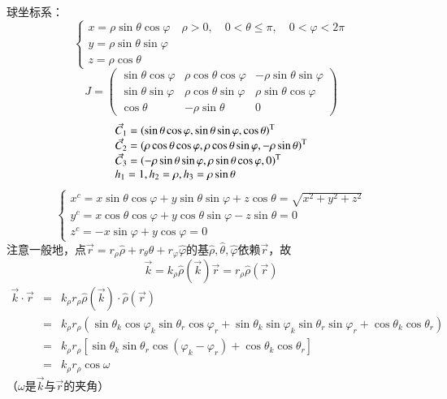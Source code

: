 \documentclass{article} %
\begin{document}
\noindent 球坐标系：
\[\left\{\begin{array}{l} {x=\rho \sin \theta \cos \varphi \quad \rho >0,\quad 0<\theta \le \pi ,\quad 0<\varphi <2\pi } \\ {y=\rho \sin \theta \sin \varphi } \\ {z=\rho \cos \theta } \end{array}\right. \] 
\[J=\left(\begin{array}{ccc} {\sin \theta \cos \varphi } & {\rho \cos \theta \cos \varphi } & {-\rho \sin \theta \sin \varphi } \\ {\sin \theta \sin \varphi } & {\rho \cos \theta \sin \varphi } & {\rho \sin \theta \cos \varphi } \\ {\cos \theta } & {-\rho \sin \theta } & {0} \end{array}\right)\] 
\[\begin{array}{l} {\vec{C}_{1} =\left(\sin \theta \cos \varphi ,\sin \theta \sin \varphi ,\cos \theta \right)^{{\rm T}} } \\ {\vec{C}_{2} =\left(\rho \cos \theta \cos \varphi ,\rho \cos \theta \sin \varphi ,-\rho \sin \theta \right)^{{\rm T}} } \\ {\vec{C}_{3} =\left(-\rho \sin \theta \sin \varphi ,\rho \sin \theta \cos \varphi ,0\right)^{{\rm T}} } \\ {h_{1} =1,h_{2} =\rho ,h_{3} =\rho \sin \theta } \end{array}\] 
\[\left\{\begin{array}{l} {x^{c} =x\sin \theta \cos \varphi +y\sin \theta \sin \varphi +z\cos \theta =\sqrt{x^{2} +y^{2} +z^{2} } } \\ {y^{c} =x\cos \theta \cos \varphi +y\cos \theta \sin \varphi -z\sin \theta =0} \\ {z^{c} =-x\sin \varphi +y\cos \varphi =0} \end{array}\right. \] 
注意一般地，点$\vec{r}=r_{\rho } \hat{\rho }+r_{\theta } \hat{\theta }+r_{\varphi } \hat{\varphi }$的基$\hat{\rho },\hat{\theta },\hat{\varphi }$依赖$\vec{r}$，故
\[\vec{k}=k_{\rho } \hat{\rho }(\vec{k})\vec{r}=r_{\rho } \hat{\rho }(\vec{r})\] 
\[\begin{array}{rcl} {\vec{k}\cdot \vec{r}} & {=} & {k_{\rho } r_{\rho } \hat{\rho }(\vec{k})\cdot \hat{\rho }(\vec{r})} \\ {} & {=} & {k_{\rho } r_{\rho } \left(\sin \theta _{k} \cos \varphi _{k} \sin \theta _{r} \cos \varphi _{r} +\sin \theta _{k} \sin \varphi _{k} \sin \theta _{r} \sin \varphi _{r} +\cos \theta _{k} \cos \theta _{r} \right)} \\ {} & {=} & {k_{\rho } r_{\rho } \left[\sin \theta _{k} \sin \theta _{r} \cos \left(\varphi _{k} -\varphi _{r} \right)+\cos \theta _{k} \cos \theta _{r} \right]} \\ {} & {=} & {k_{\rho } r_{\rho } \cos \omega } \end{array}\] 
（$\omega $是$\vec{k}$与$\vec{r}$的夹角）
\end{document}
